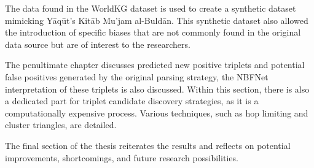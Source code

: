 The data found in the WorldKG dataset is used to create a synthetic dataset mimicking Yāqūt's Kitāb Mu'jam al-Buldān.
This synthetic dataset also allowed the introduction of specific biases that are not commonly found in the original data source
but are of interest to the researchers.

The penultimate chapter discusses predicted new positive triplets and potential false positives generated by the original
parsing strategy, the NBFNet interpretation of these triplets is also discussed.
Within this section, there is also a dedicated part for triplet candidate discovery strategies,
as it is a computationally expensive process.
Various techniques, such as hop limiting and cluster triangles, are detailed.

The final section of the thesis reiterates the results and reflects on potential improvements, shortcomings, and future
research possibilities.
